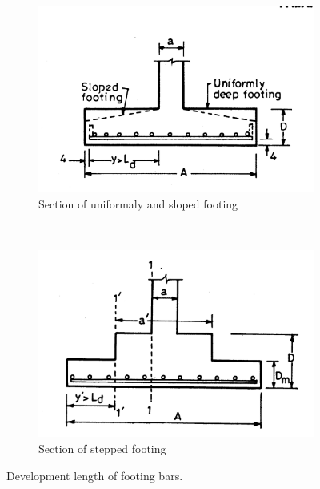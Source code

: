 \begin{figure}
  \centering
  \begin{subfigure}[b]{0.5\textwidth}
    \includegraphics[width=\textwidth]{images/fig2341.png}
    \caption{Section of uniformaly and sloped footing}
    \label{uniformallydeepfooting}
  \end{subfigure}\\
  \begin{subfigure}[b]{0.5\textwidth}
    \includegraphics[width=\textwidth]{images/fig2342.png}
    \caption{Section of stepped footing}
    \label{stepedfoting}
  \end{subfigure}
\caption{Development length of footing bars.}
\end{figure}

